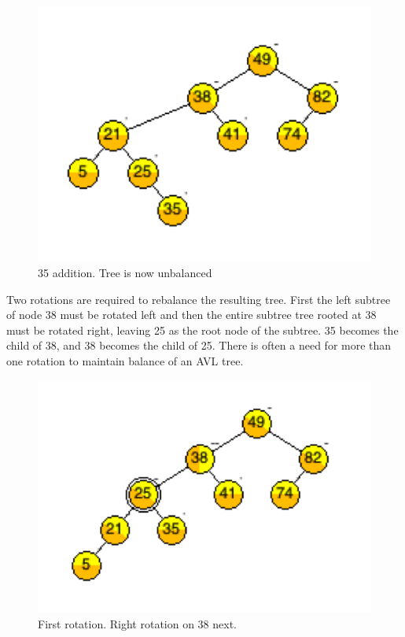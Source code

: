 \begin{figure}[H]
\centering
\includegraphics{pictures/tree9.png}
\caption{35 addition. Tree is now unbalanced}
\label{fig:tree9}
\end{figure}

Two rotations are required to rebalance the resulting tree. First the left subtree of node 38 must be rotated left and then the entire subtree tree rooted at 38 must be rotated right, leaving 25 as the root node of the subtree.   35 becomes the child of 38, and 38 becomes the child of 25.  There is often a need for more than one rotation to maintain balance  of an AVL tree.


\begin{figure}[H]
\centering
\includegraphics{pictures/tree11.png}
\caption{First rotation. Right rotation on 38 next.}
\label{fig:tree11}
\end{figure}

